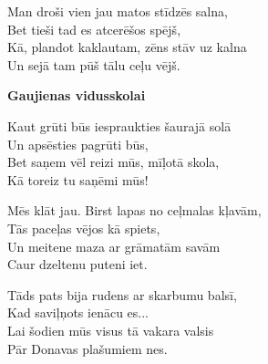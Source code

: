 \documentclass[11pt]{article}
\begin{document}
Man droši vien jau matos stīdzēs salna,\\
Bet tieši tad es atcerēšos spējš,\\
Kā, plandot kaklautam, zēns stāv uz kalna\\
Un sejā tam pūš tālu ceļu vējš.


\newpage

{\bf Gaujienas vidusskolai}

Kaut grūti būs iespraukties šaurajā solā\\
Un apsēsties pagrūti būs,\\
Bet saņem vēl reizi mūs, mīļotā skola,\\
Kā toreiz tu saņēmi mūs!

Mēs klāt jau. Birst lapas no ceļmalas kļavām,\\
Tās paceļas vējos kā spiets,\\
Un meitene maza ar grāmatām savām\\
Caur dzeltenu puteni iet.

Tāds pats bija rudens ar skarbumu balsī,\\
Kad saviļņots ienācu es...\\
Lai šodien mūs visus tā vakara valsis\\
Pār Donavas plašumiem nes.
\end{document}

